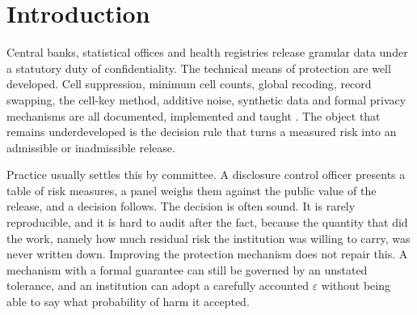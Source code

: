 \documentclass[11pt,a4paper]{article}
\theoremstyle{plain}
\theoremstyle{definition}
\begin{document}
\begin{abstract}
each 3-anonymous, none containing a single unique record, admit a pooled attack
that identifies the target with probability 0.46, which is 1.8 times the upper
bound implied by the marginals. The practical recommendation is to publish, with
every release decision, the risk estimate, its uncertainty, the tolerance, the
adversary specification, the mechanism setting, the accountable owner and the
expiry date. We additionally define a multidimensional trust position and a
deep neural proposal model, SENTRY-R, that ranks mechanism settings across
declared risk coordinates. Language models may propose scenarios for measured
development attacks; independent simultaneous attack audits remain the
decision gate. This extension is methodological and has a separate synthetic
demonstration, not a measured improvement on the reported credit or census
evaluations.

\bigskip
\noindent\textbf{Keywords:} statistical disclosure control; record linkage;
re-identification risk; data governance; differential privacy; official
statistics.
\end{abstract}

\clearpage

\section{Introduction}\label{sec:intro}

Central banks, statistical offices and health registries release granular data
under a statutory duty of confidentiality. The technical means of protection
are well developed. Cell suppression, minimum cell counts, global recoding,
record swapping, the cell-key method, additive noise, synthetic data and formal
privacy mechanisms are all documented, implemented and taught
\citep{willenborg1996,willenborg2001,duncanelliot2011,hundepool2012,templ2015,dwork2014}. The object that
remains underdeveloped is the decision rule that turns a measured risk into an
admissible or inadmissible release.

Practice usually settles this by committee. A disclosure control officer
presents a table of risk measures, a panel weighs them against the public value
of the release, and a decision follows. The decision is often sound. It is
rarely reproducible, and it is hard to audit after the fact, because the
quantity that did the work, namely how much residual risk the institution was
willing to carry, was never written down. Improving the protection mechanism
does not repair this. A mechanism with a formal guarantee can still be governed
by an unstated tolerance, and an institution can adopt a carefully accounted $\varepsilon$ without being
able to say what probability of harm it accepted.
\end{document}
